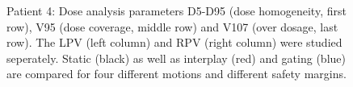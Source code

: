 \documentclass[type=dr, dr=rernat, accentcolor=tud7b,colorbacktitle, bigchapter, openright, twoside, 12pt ]{tudthesis}
\begin{document}
\begin{figure}[H]
{ }
\caption{Patient 4: Dose analysis parameters D5-D95 (dose homogeneity, first row), V95 (dose coverage, middle row) and V107 (over dosage, last row). 
The LPV (left column) and RPV (right column) were studied seperately. Static (black) as well as interplay (red) and gating (blue) 
are compared for four different motions and different safety margins.}
\label{static_interplay_gating_Pat04}
\end{figure}

\newpage 

\begin{figure}[H]
 \subfigure[V95: LPV]{
}
\end{figure}
\end{document}
